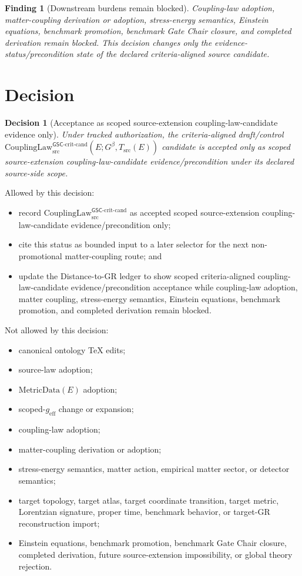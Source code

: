 \documentclass[11pt]{article}
\newcommand{\Gbeta}{G^\beta}
\newcommand{\geff}{g_{\mathrm{eff}}}
\newcommand{\CouplingLawCrit}{\mathrm{CouplingLaw}^{\mathsf{GSC}\mbox{-}\mathrm{crit}\mbox{-}\mathrm{cand}}_{\mathrm{src}}}
\newcommand{\MetricData}{\mathrm{MetricData}}
\newtheorem{decision}{Decision}
\newtheorem{finding}{Finding}
\begin{document}
\begin{finding}[Downstream burdens remain blocked]
Coupling-law adoption, matter-coupling derivation or adoption, stress-energy
semantics, Einstein equations, benchmark promotion, benchmark Gate Chair
closure, and completed derivation remain blocked. This decision changes only
the evidence-status/precondition state of the declared criteria-aligned
source candidate.
\end{finding}

\section{Decision}

\begin{decision}[Acceptance as scoped source-extension coupling-law-candidate evidence only]
Under tracked authorization, the criteria-aligned draft/control
\(\CouplingLawCrit(E;\Gbeta,T_{\mathrm{src}}(E))\) candidate is accepted only
as scoped source-extension coupling-law-candidate evidence/precondition under
its declared source-side scope.
\end{decision}

Allowed by this decision:
\begin{itemize}[leftmargin=*]
  \item record \(\CouplingLawCrit\) as accepted scoped source-extension
  coupling-law-candidate evidence/precondition only;
  \item cite this status as bounded input to a later selector for the next
  non-promotional matter-coupling route; and
  \item update the Distance-to-GR ledger to show scoped criteria-aligned
  coupling-law-candidate evidence/precondition acceptance while coupling-law
  adoption, matter coupling, stress-energy semantics, Einstein equations,
  benchmark promotion, and completed derivation remain blocked.
\end{itemize}

Not allowed by this decision:
\begin{itemize}[leftmargin=*]
  \item canonical ontology TeX edits;
  \item source-law adoption;
  \item \(\MetricData(E)\) adoption;
  \item scoped-\(\geff\) change or expansion;
  \item coupling-law adoption;
  \item matter-coupling derivation or adoption;
  \item stress-energy semantics, matter action, empirical matter sector, or
  detector semantics;
  \item target topology, target atlas, target coordinate transition, target
  metric, Lorentzian signature, proper time, benchmark behavior, or target-GR
  reconstruction import;
  \item Einstein equations, benchmark promotion, benchmark Gate Chair closure,
  completed derivation, future source-extension impossibility, or global
  theory rejection.
\end{itemize}
\end{document}
